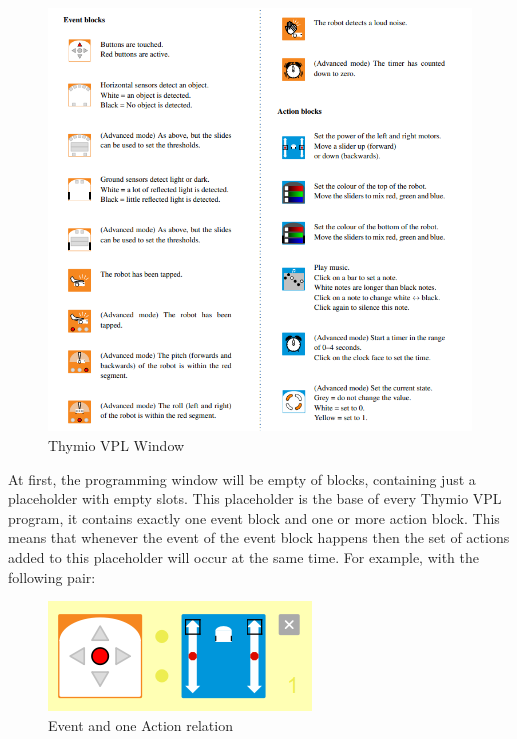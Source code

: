 \documentclass{scrartcl}
\begin{document}
\begin{figure}[h!]
  \includegraphics[width=\textwidth]{./VPL/Thymio_blocks}
  \caption{Thymio VPL Window}
  \label{fig:thymio_vpl_window}
\end{figure}

At first, the programming window will be empty of blocks, containing just a placeholder with empty slots. 
This placeholder is the base of every Thymio VPL program, it contains exactly one event block and one or more action block. 
This means that whenever the event of the event block happens then the set of actions added to this placeholder will occur at the same time. 
For example, with the following pair: \\
\begin{figure}[h!]
  \centering
  \includegraphics[scale=0.5]{./VPL/middlebtn_forward}
  \caption{Event and one Action relation}
  \label{fig:thymio_vpl_middlebtn_1e1a}
\end{figure}
\end{document}
